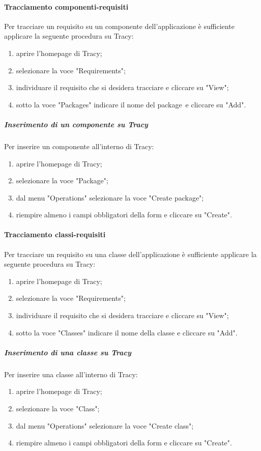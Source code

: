 \documentclass[../NormeProgetto.text]{subfiles}
\begin{document}
			\paragraph{Tracciamento componenti-requisiti}
				Per tracciare un requisito su un componente dell'applicazione è sufficiente applicare la seguente procedura su Tracy\g:
				\begin{enumerate}
					\item aprire l'homepage di Tracy\g;
					\item selezionare la voce "Requirements";
					\item individuare il requisito che si desidera tracciare e cliccare su "View";
					\item sotto la voce "Packages" indicare il nome del package\g\ e cliccare su "Add".
				\end{enumerate}
				
				\subparagraph{Inserimento di un componente su Tracy}
					Per inserire un componente all'interno di Tracy\g:
					\begin{enumerate}
						\item aprire l'homepage di Tracy\g;
						\item selezionare la voce "Package";
						\item dal menu "Operations" selezionare la voce "Create package";
						\item riempire almeno i campi obbligatori della form e cliccare su "Create".
					\end{enumerate}
			\paragraph{Tracciamento classi-requisiti}
				Per tracciare un requisito su una classe dell'applicazione è sufficiente applicare la seguente procedura su Tracy\g:
				\begin{enumerate}
					\item aprire l'homepage di Tracy\g;
					\item selezionare la voce "Requirements";
					\item individuare il requisito che si desidera tracciare e cliccare su "View";
					\item sotto la voce "Classes" indicare il nome della classe e cliccare su "Add".
				\end{enumerate}
				\subparagraph{Inserimento di una classe su Tracy}
					Per inserire una classe all'interno di Tracy\g:
					\begin{enumerate}
						\item aprire l'homepage di Tracy\g;
						\item selezionare la voce "Class";
						\item dal menu "Operations" selezionare la voce "Create class";
						\item riempire almeno i campi obbligatori della form e cliccare su "Create".
					\end{enumerate}
\end{document}
